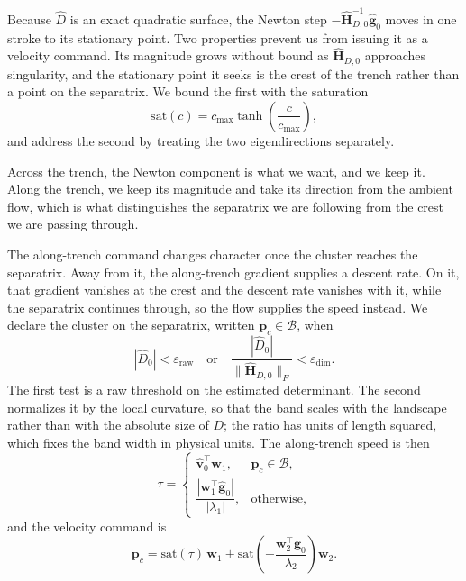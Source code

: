 \documentclass[lettersize,journal]{IEEEtran}
\begin{document}
Because $\hat{D}$ is an exact quadratic surface, the Newton step
$-\hat{\mathbf{H}}_{D,0}^{-1}\hat{\mathbf{g}}_0$ moves in one stroke to
its stationary point. Two properties prevent us from issuing it as a
velocity command. Its magnitude grows without bound as
$\hat{\mathbf{H}}_{D,0}$ approaches singularity, and the stationary point
it seeks is the crest of the trench rather than a point on the
separatrix. We bound the first with the saturation
\begin{equation}
    \mathrm{sat}(c) = c_{\max} \tanh\!\left(\frac{c}{c_{\max}}\right),
    \label{eq:sat}
\end{equation}
and address the second by treating the two eigendirections separately.

Across the trench, the Newton component is what we want, and we keep it.
Along the trench, we keep its magnitude and take its direction from the
ambient flow, which is what distinguishes the separatrix we are
following from the crest we are passing through.

The along-trench command changes character once the cluster reaches the
separatrix. Away from it, the along-trench gradient supplies a descent
rate. On it, that gradient vanishes at the crest and the descent rate
vanishes with it, while the separatrix continues through, so the flow
supplies the speed instead. We declare the cluster on the separatrix,
written $\mathbf{p}_c \in \mathcal{B}$, when
\begin{equation}
    |\hat{D}_0| < \varepsilon_{\mathrm{raw}}
    \quad\text{or}\quad
    \frac{|\hat{D}_0|}{\|\hat{\mathbf{H}}_{D,0}\|_F}
        < \varepsilon_{\dim}.
    \label{eq:flow_band}
\end{equation}
The first test is a raw threshold on the estimated determinant. The
second normalizes it by the local curvature, so that the band scales
with the landscape rather than with the absolute size of $D$; the ratio
has units of length squared, which fixes the band width in physical
units. The along-trench speed is then
\begin{equation}
    \tau =
    \begin{cases}
        \hat{\mathbf{v}}_0^\top \mathbf{w}_1,
            & \mathbf{p}_c \in \mathcal{B}, \\[6pt]
        \dfrac{|\mathbf{w}_1^\top \hat{\mathbf{g}}_0|}{|\lambda_1|},
            & \text{otherwise},
    \end{cases}
    \label{eq:tau}
\end{equation}
and the velocity command is
\begin{equation}
    \dot{\mathbf{p}}_c =
    \mathrm{sat}(\tau)\,\mathbf{w}_1
    + \mathrm{sat}\!\left(-\frac{\mathbf{w}_2^\top
      \hat{\mathbf{g}}_0}{\lambda_2}\right)\mathbf{w}_2.
    \label{eq:d_law}
\end{equation}
\end{document}
